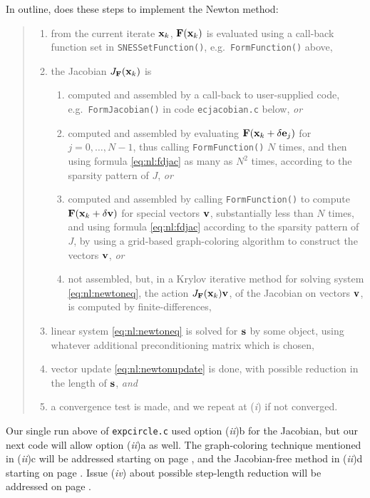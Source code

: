 In outline, \pSNES does these steps to implement the Newton method:
\begin{quote}
	\renewcommand{\labelenumi}{(\emph{\roman{enumi}})}
	\renewcommand{\labelenumii}{\emph{\alph{enumii}}.}
	\begin{enumerate}
	\item from the current iterate $\mathbf{x}_k$, $\mathbf{F}(\mathbf{x}_k)$ is evaluated using a call-back function set in \texttt{SNESSetFunction()}, e.g.~\texttt{FormFunction()} above,
	\item the Jacobian $J_{\mathbf{F}}(\mathbf{x}_k)$ is
	    \begin{enumerate}
	    \item computed and assembled by a call-back to user-supplied code, e.g.~\texttt{FormJacobian()} in code \texttt{ecjacobian.c} below, \emph{or}
	    \item computed and assembled by evaluating $\mathbf{F}(\mathbf{x}_k+\delta \mathbf{e}_j)$ for $j=0,\dots,N-1$, thus  calling \texttt{FormFunction()} $N$ times, and then using formula \eqref{eq:nl:fdjac} as many as $N^2$ times, according to the sparsity pattern of $J$, \emph{or}
	    \item computed and assembled by calling \texttt{FormFunction()} to compute $\mathbf{F}(\mathbf{x}_k+\delta \mathbf{v})$ for special vectors $\mathbf{v}$, substantially less than $N$ times, and using formula \eqref{eq:nl:fdjac} according to the sparsity pattern of $J$, by using a grid-based graph-coloring algorithm to construct the vectors $\mathbf{v}$, \emph{or}
	    \item not assembled, but, in a Krylov iterative method for solving system \eqref{eq:nl:newtoneq}, the action $J_{\mathbf{F}}(\mathbf{x}_k) \mathbf{v}$, of the Jacobian on vectors $\mathbf{v}$, is computed by finite-differences,
        \end{enumerate}
	\item linear system \eqref{eq:nl:newtoneq} is solved for $\mathbf{s}$ by some \pKSP object, using whatever additional preconditioning matrix which is chosen,
	\item vector update \eqref{eq:nl:newtonupdate} is done, with possible reduction in the length of $\mathbf{s}$, \emph{and}
	\item a convergence test is made, and we repeat at (\emph{i}) if not converged.
	\end{enumerate}
\end{quote}

Our single run above of \texttt{expcircle.c} used option (\emph{ii})b for the Jacobian, but our next code will allow option (\emph{ii})a as well.  The graph-coloring technique mentioned in (\emph{ii})c will be addressed starting on page \pageref{sec:nl:coloring}, and the Jacobian-free method in (\emph{ii})d starting on page \pageref{sec:JFNK}.  Issue (\emph{iv}) about possible step-length reduction will be addressed on page \pageref{sec:linesearch}.

